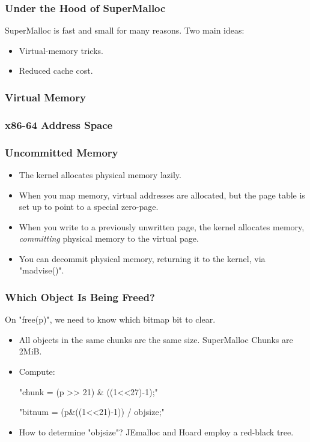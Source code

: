 \documentclass[xcolor=dvipsnames,14pt]{beamer}
\begin{document}
\begin{frame}
\frametitle{Under the Hood of SuperMalloc}

SuperMalloc is fast and small for many reasons.  Two main ideas:
\begin{itemize}
\item Virtual-memory tricks.
\item Reduced cache cost.
\end{itemize}
\end{frame}

\begin{frame}
\frametitle{Virtual Memory}
\end{frame}


\begin{frame}[fragile]
\frametitle{x86-64 Address Space}


\end{frame}

\begin{frame}[fragile]
\frametitle{Uncommitted Memory}

\begin{itemize}
\item The kernel allocates physical memory lazily.
\item When you map memory, virtual addresses are allocated, but the page table is set up to point to a special zero-page.
\item When you write to a previously unwritten page, the kernel allocates memory, \textit{committing} physical memory to the virtual page.
\item You can decommit physical memory, returning it to the kernel, via "madvise()".
\end{itemize}

\end{frame}

\begin{frame}[fragile]
\frametitle{Which Object Is Being Freed?}

On "free(p)", we need to know which bitmap bit to clear.
\begin{itemize}
\item All objects in the same chunks are the same size.  SuperMalloc Chunks are 2MiB.

\item Compute:

  "chunk  = (p >> 21) & ((1<<27)-1);"

  "bitnum = (p&((1<<21)-1)) / objsize;"

\item How to determine "objsize"?
JEmalloc and Hoard employ a red-black tree.
\end{itemize}
\end{frame}
\end{document}
